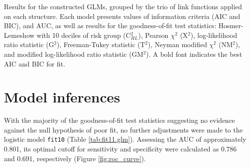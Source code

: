 \begin{table}[H]
\centering
\caption[Comparison and goodness-of-fit results for all constructed GLMs]{Results for the constructed GLMs, grouped by the trio of link functions applied on each structure. Each model presents values of information criteria (AIC and BIC), and AUC, as well as results for the goodness-of-fit test statistics: Hosmer-Lemeshow with 10 deciles of risk group (C$_{HL}^{2}$), Pearson $\chi^{2}$ (X$^{2}$), log-likelihood ratio statistic (G$^{2}$), Freeman-Tukey statistic (T$^{2}$), Neyman modified $\chi^{2}$ (NM$^{2}$), and modified log-likelihood ratio statistic (GM$^{2}$). A bold font indicates the best AIC and BIC for fit.}
\begin{adjustbox}{width=\linewidth}
\label{tab:glm.comparison}

\end{adjustbox}
\end{table}


\section{Model inferences}

With the majority of the goodness-of-fit test statistics suggesting no evidence against the null hypothesis of poor fit, no further adjustments were made to the logistic model \texttt{fit10} (Table \ref{tab:fit11.glm}).
Assessing the AUC of approximately 0.801, its optimal cutoff for sensitivity and specificity were calculated as 0.786 and 0.691, respectively (Figure \ref{fig:roc_curve}).
\\


